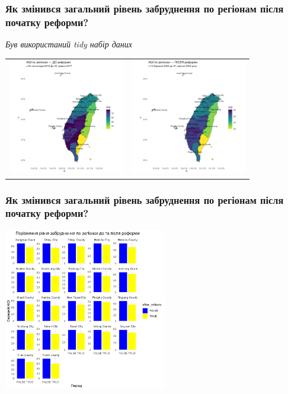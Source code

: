 \documentclass{beamer}
\begin{document}
\begin{frame}
  \frametitle{Як змінився загальний рівень забруднення по регіонам після початку реформи?}

  \textit{Був використаний tidy набір даних}

  \begin{center}
    \begin{tabular}{cc}
      \includegraphics[height=2in]{plots/question5/map_before_reform.png} &
      \includegraphics[height=2in]{plots/question5/map_after_reform.png}
    \end{tabular}
  \end{center}
\end{frame}

\begin{frame}
  \frametitle{Як змінився загальний рівень забруднення по регіонам після початку реформи?}

  \begin{center}
    \includegraphics[height=2.8in]{plots/question5/region_comparison_aqi.png}
  \end{center}
\end{frame}
\end{document}
